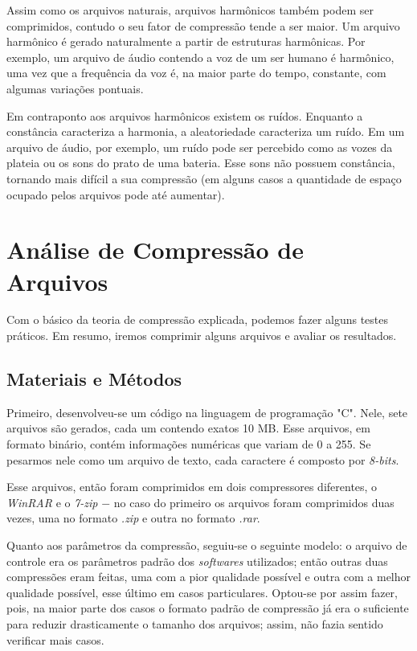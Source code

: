 \hspace{1.5 cm} Assim como os arquivos naturais, arquivos harmônicos também podem ser comprimidos, contudo o seu fator de compressão tende a ser maior. Um arquivo harmônico é gerado naturalmente a partir de estruturas harmônicas. Por exemplo, um arquivo de áudio contendo a voz de um ser humano é harmônico, uma vez que a frequência da voz é, na maior parte do tempo, constante, com algumas variações pontuais.

\hspace{1.5 cm} Em contraponto aos arquivos harmônicos existem os ruídos. Enquanto a constância caracteriza a harmonia, a aleatoriedade caracteriza um ruído. Em um arquivo de áudio, por exemplo, um ruído pode ser percebido como as vozes da plateia ou os sons do prato de uma bateria. Esse sons não possuem constância, tornando mais difícil a sua compressão (em alguns casos a quantidade de espaço ocupado pelos arquivos pode até aumentar).

\section{Análise de Compressão de Arquivos}
Com o básico da teoria de compressão explicada, podemos fazer alguns testes práticos. Em resumo, iremos comprimir alguns arquivos e avaliar os resultados.

\subsection{Materiais e Métodos}
Primeiro, desenvolveu-se um código na linguagem de programação "C". Nele, sete arquivos são gerados, cada um contendo exatos 10 MB. Esse arquivos, em formato binário, contém informações numéricas que variam de 0 a 255. Se pesarmos nele como um arquivo de texto, cada caractere é composto por \textit{8-bits}.

\hspace{1.5 cm} Esse arquivos, então foram comprimidos em dois compressores diferentes, o \textit{WinRAR} e o \textit{7-zip} $-$ no caso do primeiro os arquivos foram comprimidos duas vezes, uma no formato \textit{.zip} e outra no formato \textit{.rar}.

\hspace{1.5 cm} Quanto aos parâmetros da compressão, seguiu-se o seguinte modelo: o arquivo de controle era os parâmetros padrão dos \textit{softwares} utilizados; então outras duas compressões eram feitas, uma com a pior qualidade possível e outra com a melhor qualidade possível, esse último em casos particulares. Optou-se por assim fazer, pois, na maior parte dos casos o formato padrão de compressão já era o suficiente para reduzir drasticamente o tamanho dos arquivos; assim, não fazia sentido verificar mais casos.

